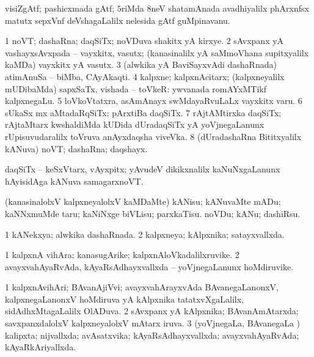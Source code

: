 {{{{{{{{{{\bentry 
{} 
\gl{\nA}
\expl{}
\bmng
 visiZgAtf; pashicxmada gAtf; $5$riMda $8$neV shatamAnada avadhiyalilx phArxnfsx matutx sepxVnf deVshagaLalilx nelesida gAtf guMpinavanu. 
\emng
\eentry

\bentry 
{} 
\gl{\nA}
\expl{}
\bmng
\bnum
\num{1} noVT; dashaRna; daqSiTx; noVDuva shakitx yA kirxye. 
\num{2} sAvxpanx yA vashayxsAvxpada -- vayxkitx, vasutx; (kanasinalilx yA saMmoVhana supitxyalilx kaMDa) vayxkitx yA vasutx. 
\num{3} (alwkika yA BaviSayxvAdi dashaRnada) atimAnuSa -- biMba, CAyAkaqti. 
\num{4} kalpxne; kalpxnAcitarx; (kalpxneyalilx mUDibaMda) sapxSaTx, vishada -- toVkeR:  ywvanada romAYxMTikf kalpxnegaLu. 
\num{5} loVkoVtatxra, asAmAnayx swMdayaRvuLaLx vayxkitx \mo varu. 
\num{6} sUkaSx mx aMtadaRqSiTx; pArxtiBa daqSiTx. 
\num{7} rAjtAMtirxka daqSiTx; rAjtaMtarx kwshaldiMda kUDida dUradaqSiTx yA yoVjnegaLanunx rUpisuvudaralilx toVruva anAyxdaqsha viveVka. 
\num{8} (dUradashaRna Bititxyalilx kANuva) noVT; dashaRna; daqshayx. 
\enum
\emng

\noindent 
\gl{\pagu}
\expl{}
\bmng
  daqSiTx -- keSxVtarx, vAyxpitx; yAvudeV dikikxnalilx kaNuNxgaLanunx hAyisidAga kANuva samagarxnoVT. 
\emng
\eentry

\bentry 
{} 
\gl{\sakirx}
\expl{}
\bmng
 (kanasinalolxV kalpxneyalolxV kaMDaMte) 
\banum
{} kANisu; kANuvaMte mADu; kaNNxmuMde taru; kaNiNxge biVLisu; parxkaTisu. 
 noVDu; kANu; dashiRsu. 
\eanum
\emng
\eentry

\bentry
{} 
\gl{\gu}
\expl{}
\bmng
\bnum
\num{1} kANekxya; alwkika dashaRnada. 
\num{2} kalpxneya; kAlpxnika; satayxvallxda. 
\enum
\emng
\eentry

\bentry 
{} 
\gl{\nA}
\expl{}
\bmng
\bnum
\num{1} kalpxnA vihAra; kanasugArike; kalpxnAloVkadalilxruvike. 
\num{2} avayxvahAyaRvAda, kAyaRsAdhayxvallxda -- yoVjnegaLanunx hoMdiruvike. 
\enum
\emng
\eentry

\bentry 
{} 
\gl{\gu}
\expl{}
\bmng
\bnum
\num{1} kalpxnAvihAri; BAvanAjiVvi; avayxvahArayxvAda BAvanegaLanonxV, kalpxnegaLanonxV hoMdiruva yA kAlpxnika tatatxvXgaLalilx, sidAdhxMtagaLalilx OlADuva. 
\num{2} sAvxpanx yA kAlpxnika; BAvanAmAtarxda; savxpanxdalolxV kalpxneyalolxV mAtarx iruva. 
\num{3} (yoVjnegaLa, BAvanegaLa \vi) kalipxta; nijvallxda; avAsatxvika; kAyaRsAdhayxvallxda; avayxvahAyaRvAda; kAyaRkAriyallxda. 
\enum
\emng
\eentry

}}}}}}}}}}
